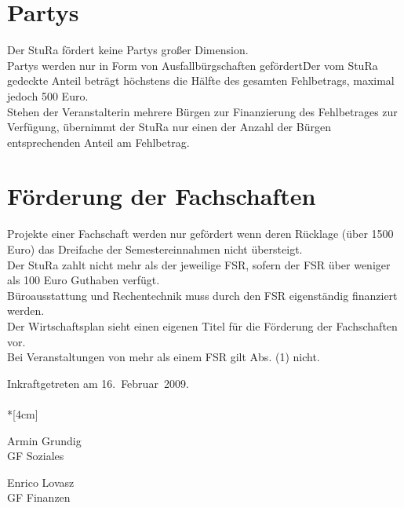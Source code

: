 \begin{multicols}{2}
\section{Partys}
\Abs \Satz Der StuRa fördert keine Partys großer Dimension.\\

\Abs \Satz Partys werden nur in Form von Ausfallbürgschaften gefördert\. Der vom StuRa gedeckte
Anteil beträgt höchstens die Hälfte des gesamten Fehlbetrags, maximal jedoch 500 Euro.\\

\Abs \Satz Stehen der Veranstalterin mehrere Bürgen zur Finanzierung des Fehlbetrages zur
Verfügung, übernimmt der StuRa nur einen der Anzahl der Bürgen entsprechenden Anteil am
Fehlbetrag.

\section{Förderung der Fachschaften}
\Abs \Satz Projekte einer Fachschaft werden nur gefördert wenn deren Rücklage (über 1500 Euro) das
Dreifache der Semestereinnahmen nicht übersteigt.\\

\Abs \Satz Der StuRa zahlt nicht mehr als der jeweilige FSR, sofern der FSR über weniger
als 100 Euro Guthaben verfügt.\\

\Abs \Satz Büroausstattung und Rechentechnik muss durch den FSR eigenständig finanziert werden.\\

\Abs \Satz Der Wirtschaftsplan sieht einen eigenen Titel für die Förderung der Fachschaften vor.\\

\Abs \Satz Bei Veranstaltungen von mehr als einem FSR gilt Abs. (1) nicht.
\end{multicols}

\nopagebreak
\vspace{1cm}
Inkraftgetreten am 16.~Februar~2009.
\\

\normalsize
~\\*[4cm]
\begin{center}
\hspace*{\fill}
\parbox{7cm}{Armin Grundig\\GF Soziales}
\hfill\parbox{7cm}{Enrico Lovasz\\GF Finanzen}
\hspace*{\fill}
\end{center}

